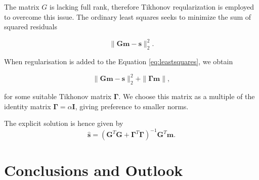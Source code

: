 \documentclass[12pt,a4paper,english]{article}
\begin{document}
The matrix $G$ is lacking full rank, therefore Tikhonov reqularization is employed to overcome this issue. The ordinary least squares seeks to minimize the sum of squared residuals

\begin{equation}
\| \mathbf{Gm}-\mathbf{s} \|_2^2.
\label{eq:leastsquares}
\end{equation}

When regularisation is added to the Equation \ref{eq:leastsquares}, we obtain

\begin{equation}
\| \mathbf{Gm}-\mathbf{s} \|_2^2 + \| \bm{\Gamma}\mathbf{m} \|, 
\label{eq:tikhonov}
\end{equation}

for some suitable Tikhonov matrix $\bm{\Gamma}$. We choose this matrix as a multiple of the identity matrix $\bm{\Gamma} = \alpha\mathbf{I}$, giving preference to smaller norms. 

The explicit solution is hence given by 
\begin{equation}
\hat{\mathbf{s}} = (\mathbf{G}^T\mathbf{G} + \bm{\Gamma}^T\bm{\Gamma})^{-1}\mathbf{G}^T\mathbf{m}.  
\end{equation}

\section{Conclusions and Outlook}


  
   
\end{document}
